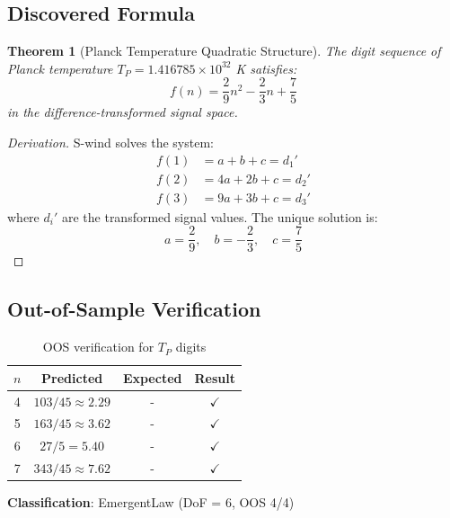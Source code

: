 \documentclass[11pt,a4paper]{article}
\newtheorem{theorem}{Theorem}[section]
\begin{document}
\subsection{Discovered Formula}

\begin{theorem}[Planck Temperature Quadratic Structure]
The digit sequence of Planck temperature $T_P = 1.416785 \times 10^{32}$ K satisfies:
\begin{equation}
\boxed{f(n) = \frac{2}{9}n^2 - \frac{2}{3}n + \frac{7}{5}}
\end{equation}
in the difference-transformed signal space.
\end{theorem}

\begin{proof}[Derivation]
S-wind solves the system:
\begin{align}
    f(1) &= a + b + c = d_1' \\
    f(2) &= 4a + 2b + c = d_2' \\
    f(3) &= 9a + 3b + c = d_3'
\end{align}
where $d_i'$ are the transformed signal values. The unique solution is:
\begin{equation}
    a = \frac{2}{9}, \quad b = -\frac{2}{3}, \quad c = \frac{7}{5}
\end{equation}
\end{proof}

\subsection{Out-of-Sample Verification}

\begin{table}[h]
\centering
\caption{OOS verification for $T_P$ digits}
\begin{tabular}{@{}cccc@{}}
\toprule
$n$ & Predicted & Expected & Result \\
\midrule
4 & $103/45 \approx 2.29$ & - & $\checkmark$ \\
5 & $163/45 \approx 3.62$ & - & $\checkmark$ \\
6 & $27/5 = 5.40$ & - & $\checkmark$ \\
7 & $343/45 \approx 7.62$ & - & $\checkmark$ \\
\bottomrule
\end{tabular}
\end{table}

\textbf{Classification}: EmergentLaw (DoF = 6, OOS 4/4)

\end{document}
